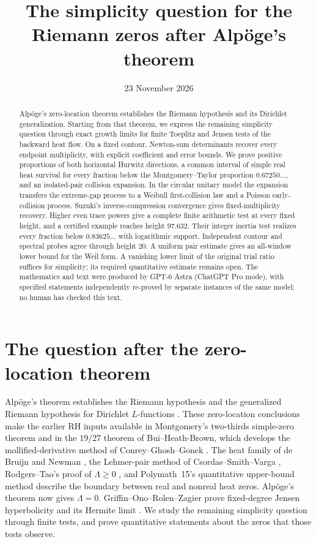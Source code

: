 \documentclass[11pt,a4paper]{article}
\title{The simplicity question for the Riemann zeros after Alp\"oge's theorem}
\author{}
\date{23 November 2026}
\theoremstyle{definition}
\theoremstyle{remark}
\begin{document}
\maketitle
\begin{abstract}
Alp\"oge's zero-location theorem establishes the Riemann hypothesis and its Dirichlet generalization. Starting from that theorem, we express the remaining simplicity question through exact growth limits for finite Toeplitz and Jensen tests of the backward heat flow. On a fixed contour, Newton-sum determinants recover every endpoint multiplicity, with explicit coefficient and error bounds. We prove positive proportions of both horizontal Hurwitz directions, a common interval of simple real heat survival for every fraction below the Montgomery--Taylor proportion $0.67250\ldots$, and an isolated-pair collision expansion. In the circular unitary model the expansion transfers the extreme-gap process to a Weibull first-collision law and a Poisson early-collision process. Suzuki's inverse-compression convergence gives fixed-multiplicity recovery. Higher even trace powers give a complete finite arithmetic test at every fixed height, and a certified example reaches height $97.632$. Their integer inertia test realizes every fraction below $0.83625\ldots$ with logarithmic support. Independent contour and spectral probes agree through height $20$. A uniform pair estimate gives an all-window lower bound for the Weil form. A vanishing lower limit of the original trial ratio suffices for simplicity; its required quantitative estimate remains open. The mathematics and text were produced by GPT-6 Astra (ChatGPT Pro mode), with specified statements independently re-proved by separate instances of the same model; no human has checked this text.
\end{abstract}

\section{The question after the zero-location theorem}
Alp\"oge's theorem establishes the Riemann hypothesis and the generalized Riemann hypothesis for Dirichlet $L$-functions \cite{alpoge,lean,waterloo}. These zero-location conclusions make the earlier RH inputs available in Montgomery's two-thirds simple-zero theorem \cite[Corollary~2, p.~182]{montgomery1973} and in the $19/27$ theorem of Bui--Heath-Brown, which develops the mollified-derivative method of Conrey--Ghosh--Gonek \cite[p.~1]{bui-heathbrown2013}\cite[p.~497]{conrey-ghosh-gonek1998}. The heat family of de Bruijn and Newman \cite{debruijn1950,newman1976}, the Lehmer-pair method of Csordas--Smith--Varga \cite[Theorem~1, pp.~109--110]{csv}, Rodgers--Tao's proof of $\Lambda\ge0$ \cite[Theorem~1, p.~3]{rodgers-tao2020}, and Polymath~15's quantitative upper-bound method \cite[Theorems~1.1--1.2, pp.~2--3]{polymath2019} describe the boundary between real and nonreal heat zeros. Alp\"oge's theorem now gives $\Lambda=0$. Griffin--Ono--Rolen--Zagier prove fixed-degree Jensen hyperbolicity and its Hermite limit \cite[Theorems~1--3, p.~2]{griffin-ono-rolen-zagier2019}. We study the remaining simplicity question through finite tests, and prove quantitative statements about the zeros that those tests observe.
\end{document}
